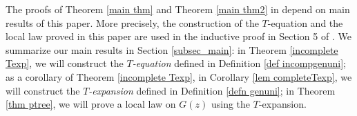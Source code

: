 \documentclass{article}
\makeatletter
\newcommand{\1}{\mathds{1}}
\numberwithin{equation}{section}
\theoremstyle{plain} %
\theoremstyle{remark}
\newcommand{\cor}{\color{red}}
\newcommand{\incomp}{{\text{$T$-equation}}}
\renewcommand{\subsection}{\@startsection
	{subsection}%
	{2}%
	{0mm}%
	{-\baselineskip}%
	{0.5\baselineskip}%
	{\normalfont\bf\itshape}} %
\makeatother
\begin{document}

The proofs of Theorem \ref{main thm} and Theorem \ref{main thm2} in \cite{PartI_high} depend on main results of this paper. More precisely, the construction of the $T$-equation and the local law proved in this paper are used in the inductive proof in Section 5 of \cite{PartI_high}. We summarize our main results in Section \ref{subsec_main}: in Theorem \ref{incomplete Texp}, we will construct the \emph{$T$-equation} defined in Definition \ref{def incompgenuni}; as a corollary of Theorem \ref{incomplete Texp}, in Corollary \ref{lem completeTexp}, we will construct the \emph{$T$-expansion} defined in Definition \ref{defn genuni}; in Theorem \ref{thm ptree}, we will prove a local law on $G(z)$ using the $T$-expansion.

\end{document}
